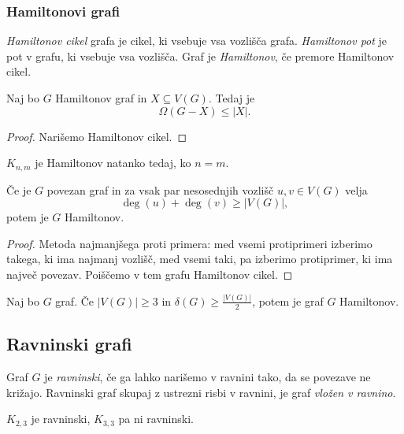 \subsubsection{Hamiltonovi grafi}
\begin{definicija}
    \emph{Hamiltonov cikel} grafa je cikel, ki vsebuje vsa vozlišča grafa. \emph{Hamiltonov pot} je pot v grafu, ki vsebuje vsa vozlišča. Graf je \emph{Hamiltonov}, če premore Hamiltonov cikel.
\end{definicija}

\begin{izrek}
    Naj bo $G$ Hamiltonov graf in $X \subseteq V(G)$. Tedaj je $$\Omega(G-X) \leq |X|.$$
\end{izrek}

\begin{proof}
    Narišemo Hamiltonov cikel.
\end{proof}

\begin{primer}
    $K_{n,m}$ je Hamiltonov natanko tedaj, ko $n=m$.
\end{primer}

\begin{izrek}[Ore]
    Če je $G$ povezan graf in za vsak par nesosednjih vozlišč $u, v \in V(G)$ velja $$\deg(u)+\deg(v) \geq |V(G)|,$$ potem je $G$ Hamiltonov.
\end{izrek}

\begin{proof}
    Metoda najmanjšega proti primera: med vsemi protiprimeri izberimo takega, ki ima najmanj vozlišč, med vsemi taki, pa izberimo protiprimer, ki ima največ povezav. Poiščemo v tem grafu Hamiltonov cikel.
\end{proof}

\begin{izrek}[Dirac]
    Naj bo $G$ graf. Če $|V(G)| \geq 3$ in $\delta(G) \geq \frac{|V(G)|}{2}$, potem je graf $G$ Hamiltonov.
\end{izrek}

\subsection{Ravninski grafi}
\begin{definicija}
    Graf $G$ je \emph{ravninski}, če ga lahko narišemo v ravnini tako, da se povezave ne križajo. Ravninski graf skupaj z ustrezni risbi v ravnini, je graf \emph{vložen v ravnino}.
\end{definicija}

\begin{primer}
    $K_{2,3}$ je ravninski, $K_{3,3}$ pa ni ravninski.
\end{primer}

